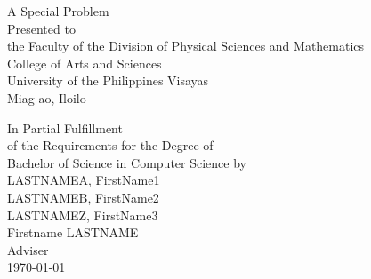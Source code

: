 \begin{titlepage}
\centering


\vspace{1.75cm}
A Special Problem\\
Presented to\\
the Faculty of the Division of Physical Sciences and Mathematics\\
College of Arts and Sciences\\
University of the Philippines Visayas\\
Miag-ao, Iloilo

\vspace{1.75cm}
In Partial Fulfillment\\
of the Requirements for the Degree of\\
Bachelor of Science in Computer Science
\vspace{1.75cm}
by\\

\vspace{1cm}
LASTNAMEA, FirstName1  \\
LASTNAMEB, FirstName2  \\
LASTNAMEZ, FirstName3  \\

\vspace{1.75cm}
Firstname LASTNAME \\
Adviser\\

\vspace{1.75cm}
\today
\end{titlepage}
